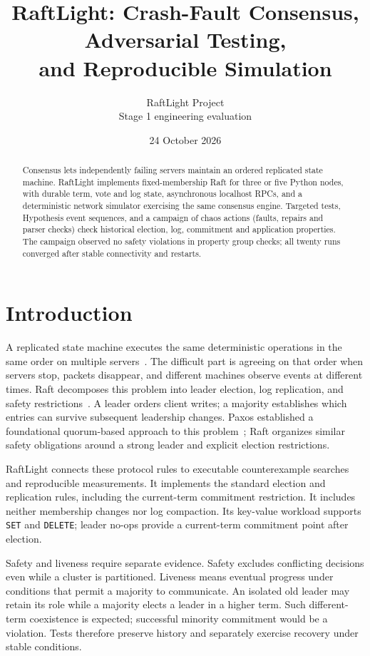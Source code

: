 \documentclass[10pt,a4paper]{article}
\title{RaftLight: Crash-Fault Consensus, Adversarial Testing,\\and Reproducible Simulation}
\author{RaftLight Project\\\small Stage 1 engineering evaluation}
\date{24 October 2026}
\begin{document}
\maketitle
\begin{abstract}
Consensus lets independently failing servers maintain an ordered replicated state
machine. RaftLight implements fixed-membership Raft for three or five Python
nodes, with durable term, vote and log state, asynchronous localhost RPCs, and a
deterministic network simulator exercising the same consensus engine. Targeted
tests, Hypothesis event sequences, and a campaign of \FaultCount{} chaos actions
(faults, repairs and parser checks) check historical election, log, commitment and application
properties. The campaign observed no safety violations in \CheckCount{} property
group checks; all twenty runs converged after stable connectivity and restarts.
\AbstractFindings{}
\end{abstract}

\section{Introduction}
A replicated state machine executes the same deterministic operations in the
same order on multiple servers~\cite{schneider}. The difficult part is agreeing on that order when
servers stop, packets disappear, and different machines observe events at
different times. Raft decomposes this problem into leader election, log
replication, and safety restrictions~\cite{raft}. A leader orders client writes;
a majority establishes which entries can survive subsequent leadership changes.
Paxos established a foundational quorum-based approach to this problem~\cite{lamport};
Raft organizes similar safety obligations around a strong leader and explicit
election restrictions.

RaftLight connects these protocol rules to executable counterexample searches
and reproducible measurements. It implements the standard election and
replication rules, including the current-term commitment restriction. It includes
neither membership changes nor log compaction. Its key-value workload supports
\texttt{SET} and \texttt{DELETE}; leader no-ops provide a current-term commitment
point after election.

Safety and liveness require separate evidence. Safety excludes conflicting
decisions even while a cluster is partitioned. Liveness means eventual progress
under conditions that permit a majority to communicate. An isolated old leader
may retain its role while a majority elects a leader in a higher term. Such
different-term coexistence is expected; successful minority commitment would be
a violation. Tests therefore preserve history and separately exercise recovery
under stable conditions.
\end{document}

